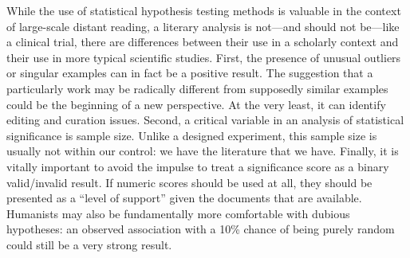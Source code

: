 While the use of statistical hypothesis testing methods is valuable in the context of large-scale distant reading, a literary analysis is not---and should not be---like a clinical trial, there are differences between their use in a scholarly context and their use in more typical scientific studies.
First, the presence of unusual outliers or singular examples can in fact be a positive result.
The suggestion that a particularly work may be radically different from supposedly similar examples could be the beginning of a new perspective.
At the very least, it can identify editing and curation issues.
Second, a critical variable in an analysis of statistical significance is sample size.
Unlike a designed experiment, this sample size is usually not within our control: we have the literature that we have.
Finally, it is vitally important to avoid the impulse to treat a significance score as a binary valid/invalid result.
If numeric scores should be used at all, they should be presented as a ``level of support'' given the documents that are available.
Humanists may also be fundamentally more comfortable with dubious hypotheses: an observed association with a 10\% chance of being purely random could still be a very strong result.

